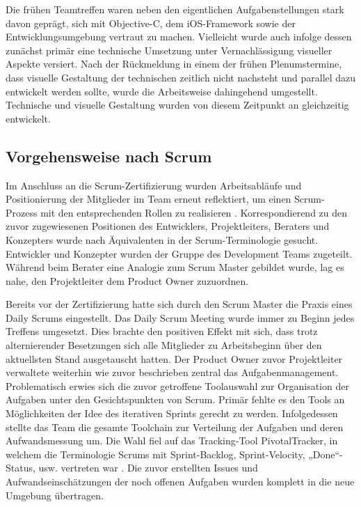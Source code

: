 	Die frühen Teamtreffen waren neben den eigentlichen Aufgabenstellungen stark davon geprägt, sich mit Objective-C, dem iOS-Framework sowie der Entwicklungsumgebung vertraut zu machen. Vielleicht wurde auch infolge dessen zunächst primär eine technische Umsetzung unter Vernachlässigung visueller Aspekte versiert. Nach der Rückmeldung in einem der frühen Plenumstermine, dass visuelle Gestaltung der technischen zeitlich nicht nachsteht und parallel dazu entwickelt werden sollte, wurde die Arbeitsweise dahingehend umgestellt. Technische und visuelle Gestaltung wurden von diesem Zeitpunkt an gleichzeitig entwickelt. 

\subsection{Vorgehensweise nach Scrum}
	Im Anschluss an die Scrum-Zertifizierung wurden Arbeitsabläufe und Positionierung der Mitglieder im Team erneut reflektiert, um einen Scrum-Prozess mit den entsprechenden Rollen zu realisieren \citep{ScrumGuideIntro14}. Korrespondierend zu den zuvor zugewiesenen Positionen des Entwicklers, Projektleiters, Beraters und Konzepters wurde nach Äquivalenten in der Scrum-Terminologie gesucht. Entwickler und Konzepter wurden der Gruppe des Development Teams zugeteilt. Während beim Berater eine Analogie zum Scrum Master gebildet wurde, lag es nahe, den Projektleiter dem Product Owner zuzuordnen. 

	Bereits vor der Zertifizierung hatte sich durch den Scrum Master die Praxis eines Daily Scrums eingestellt. Das Daily Scrum Meeting wurde immer zu Beginn jedes Treffens umgesetzt. Dies brachte den positiven Effekt mit sich, dass trotz alternierender Besetzungen sich alle Mitglieder zu Arbeitsbeginn über den aktuellsten Stand ausgetauscht hatten. Der Product Owner zuvor Projektleiter verwaltete weiterhin wie zuvor beschrieben zentral das Aufgabenmanagement. 
Problematisch erwies sich die zuvor getroffene Toolauswahl zur Organisation der Aufgaben unter den Gesichtspunkten von Scrum. Primär fehlte es den Tools an Möglichkeiten der Idee des iterativen Sprints gerecht zu werden. Infolgedessen stellte das Team die gesamte Toolchain zur Verteilung der Aufgaben und deren Aufwandsmessung um. Die Wahl fiel auf das Tracking-Tool PivotalTracker, in welchem die Terminologie Scrums mit Sprint-Backlog, Sprint-Velocity, „Done“- Status, usw. vertreten war \citep{PivotalTracker14}. Die zuvor erstellten Issues und Aufwandseinschätzungen der noch offenen Aufgaben wurden komplett in die neue Umgebung übertragen.


